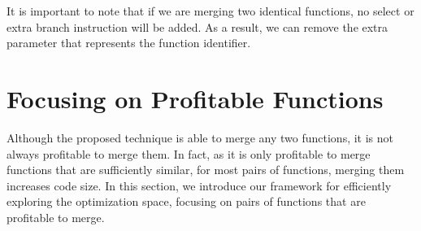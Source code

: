 It is important to note that if we are merging two identical functions, no
select or extra branch instruction will be added.
As a result, we can remove the extra parameter that represents the function
identifier.

\section{Focusing on Profitable Functions}
\label{sec:framework}


Although the proposed technique is able to merge any two functions, it is not always profitable to merge them. In fact, as it is only
profitable to merge functions that are sufficiently similar, for most pairs of functions, merging them increases code size.
In this section, we introduce our framework for efficiently exploring the
optimization space, focusing on pairs of functions that are profitable to merge. 



